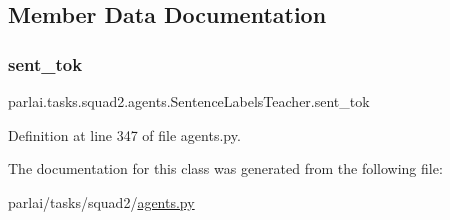 \subsection{Member Data Documentation}
\mbox{\label{classparlai_1_1tasks_1_1squad2_1_1agents_1_1SentenceLabelsTeacher_a38eaa848e9051e5fb1b0a63f2308481e}} 
\subsubsection{\texorpdfstring{sent\+\_\+tok}{sent\_tok}}
{\footnotesize\ttfamily parlai.\+tasks.\+squad2.\+agents.\+Sentence\+Labels\+Teacher.\+sent\+\_\+tok}



Definition at line 347 of file agents.\+py.



The documentation for this class was generated from the following file\+:\begin{DoxyCompactItemize}
\item 
parlai/tasks/squad2/\hyperlink{parlai_2tasks_2squad2_2agents_8py}{agents.\+py}\end{DoxyCompactItemize}

